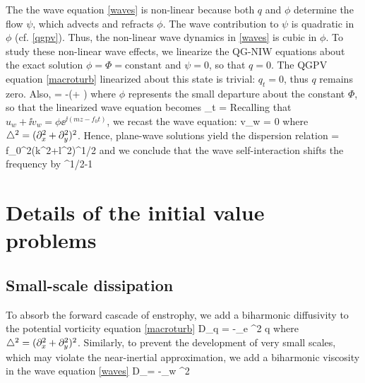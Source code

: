 \documentclass{jfm}
\begin{document}
The the wave equation \eqref{waves} is non-linear because both $q$ and $\phi$
determine the flow $\psi$, which advects and refracts $\phi$. The wave contribution
to $\psi$ is quadratic in $\phi$ (cf. \eqref{qgpv}). Thus, the non-linear wave
dynamics in   \eqref{waves} is cubic in $\phi$.
To study these non-linear wave effects, we linearize the QG-NIW equations  about
 the exact solution
$\phi = \Phi = \text{constant}$ and $\psi = 0$, so that $q=0$. The QGPV
equation \eqref{macroturb} linearized about this state is trivial: $q_t = 0$,
 thus $q$ remains zero. Also,
\beq
\label{lin_q}
 \lap \psi = -\lap\half(\phi + \phis)\com
\eeq
where $\phi$ represents the small departure about the constant $\Phi$, so that
the linearized wave equation becomes
\beq
\phi_t =  \per
\eeq
Recalling that $u_w + \ii v_w = \phi \ee^{\ii (mz -f_0 t)}$, we recast the wave
equation:
\beq
{} v_w = 0\com
\eeq
where $\triangle^2 = (\partial_x^2 + \partial_y^2)^2$. Hence, plane-wave solutions yield the
dispersion relation
\beq
\omega = \half f_0\lambda^2(k^2+l^2)^{1/2}\com
\eeq
and we conclude that the wave self-interaction shifts the frequency by
\beq
{}^{1/2}-1\per
\eeq


\section{Details of the initial value problems}

\subsection{Small-scale dissipation}
To absorb the forward cascade of enstrophy, we add a biharmonic diffusivity to the
potential vorticity equation \eqref{macroturb}
\beq
D_q = -\kappa_e \lap^2 q\com
\eeq
where $\triangle^2 = (\partial_x^2+\partial_y^2)^2$.
Similarly, to prevent the development of very small scales, which may violate the
near-inertial approximation, we add a biharmonic viscosity in the wave equation
\eqref{waves}
\beq
D_\phi = -\nu_w \lap^2 \phi\per
\eeq
\end{document}
